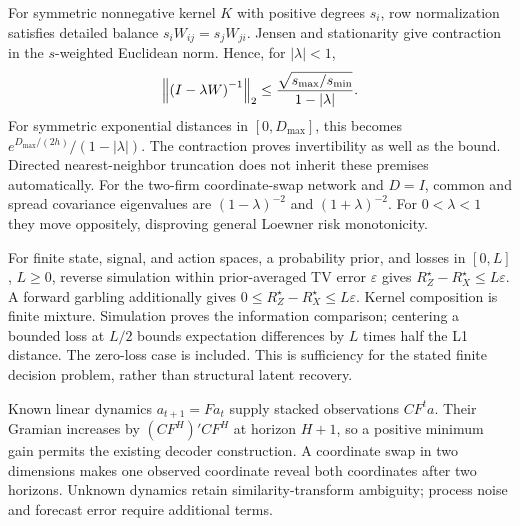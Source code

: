 \documentclass[11pt]{article}
\renewcommand{\lean}[1]{\ignorespaces}
\renewcommand{\leanok}{\ignorespaces}
\begin{document}
For symmetric nonnegative kernel $K$ with positive degrees $s_i$, row
normalization satisfies detailed balance $s_i W_{ij}=s_j W_{ji}$. Jensen and
stationarity give contraction in the $s$-weighted Euclidean norm. Hence, for
$|\lambda|<1$,
\[
  \left\lVert{(I-\lambda W)}^{-1}\right\rVert_2\le
  \frac{\sqrt{s_{\max}/s_{\min}}}{1-|\lambda|}.
\]
\lean{FreeFoundations.ReversibleNetwork.normalize_resolvent_l2_bound}\leanok{}
For symmetric exponential distances in $[0,D_{\max}]$, this becomes
$e^{D_{\max}/(2h)}/(1-|\lambda|)$.
\lean{FreeFoundations.ReversibleNetwork.exponential_resolvent_l2_bound}\leanok{}
The contraction proves invertibility as well as the bound. Directed
nearest-neighbor truncation does not inherit these premises automatically.
For the two-firm coordinate-swap network and $D=I$, common and spread covariance
eigenvalues are ${(1-\lambda)}^{-2}$ and ${(1+\lambda)}^{-2}$. For $0<\lambda<1$
they move oppositely, disproving general Loewner risk monotonicity.
\lean{FreeFoundations.ComparativeStatics.swap_covariance_common,
  FreeFoundations.ComparativeStatics.swap_covariance_spread,
FreeFoundations.ComparativeStatics.swap_covariance_not_ge_identity}\leanok{}

For finite state, signal, and action spaces, a probability prior, and
losses in $[0,L]$, $L\ge0$, reverse simulation within prior-averaged TV error
$\varepsilon$ gives $R_Z^\star-R_X^\star\le L\varepsilon$.
A forward garbling additionally gives
$0\le R_Z^\star-R_X^\star\le L\varepsilon$.
\lean{FreeFoundations.Decision.garbling_risk,
  FreeFoundations.FiniteProbability.approximate_decoder,
  FreeFoundations.FiniteProbability.approximate_sufficiency,
FreeFoundations.FiniteProbability.approximate_decoder_uniform}\leanok{}
Kernel composition is finite mixture. Simulation proves the information
comparison; centering a bounded loss at $L/2$ bounds expectation differences
by $L$ times half the L1 distance. The zero-loss case is included.
This is sufficiency for the stated finite decision problem, rather than
structural latent recovery.

Known linear dynamics $a_{t+1}=Fa_t$ supply stacked observations $CF^t a$.
Their Gramian increases by $(CF^H)'CF^H$ at horizon $H+1$, so a positive
minimum gain permits the existing decoder construction. A coordinate swap in
two dimensions makes one observed coordinate reveal both coordinates after two
horizons. Unknown dynamics retain similarity-transform ambiguity; process
noise and forecast error require additional terms.
\lean{FreeFoundations.Dynamics.observation_gram,
  FreeFoundations.Dynamics.gramian_mono,
  FreeFoundations.Dynamics.observable_decoder,
FreeFoundations.Dynamics.two_horizons_distinguish}\leanok{}
\end{document}
